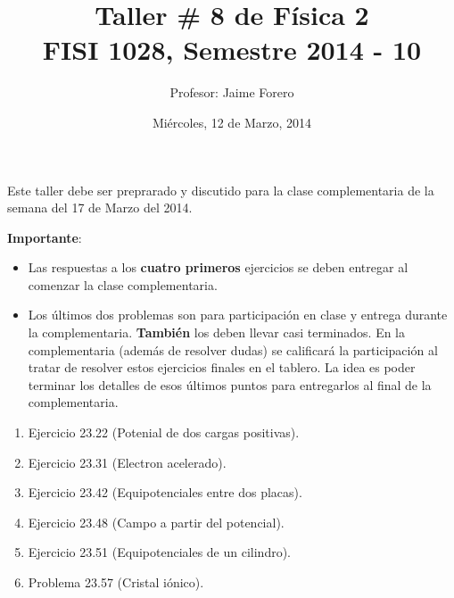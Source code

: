 \documentclass{article}
\title{Taller \# 8 de F\'isica 2\\ FISI 1028, Semestre 2014 - 10}
\author{Profesor: Jaime Forero}
\date{Mi\'ercoles, 12 de Marzo, 2014}
\begin{document}
\maketitle
\thispagestyle{empty}

\noindent

Este taller debe ser preprarado y discutido para la clase
complementaria de la semana del 17 de Marzo del 2014. 

\noindent
{\bf Importante}:
\begin{itemize}

\item
Las respuestas a los {\bf cuatro primeros} ejercicios se deben entregar
al comenzar la clase complementaria. 
\item 

Los \'ultimos dos problemas son para participaci\'on en clase y entrega
durante la complementaria. {\bf{Tambi\'en}} los deben llevar casi
terminados. En la complementaria (adem\'as de resolver dudas) se
calificar\'a la participaci\'on al tratar de resolver estos ejercicios
finales en el tablero. La idea es poder terminar los  detalles de esos
\'ultimos puntos para entregarlos al final de la complementaria.
\end{itemize}

\begin{enumerate}


\item
Ejercicio 23.22 (Potenial de dos cargas positivas).

\item 
Ejercicio 23.31 (Electron acelerado).

\item 
Ejercicio 23.42 (Equipotenciales entre dos placas).

\item
Ejercicio 23.48 (Campo a partir del potencial).

\item
Ejercicio 23.51 (Equipotenciales de un cilindro).

\item 
Problema 23.57 (Cristal i\'onico).

\end{enumerate}
\end{document}
